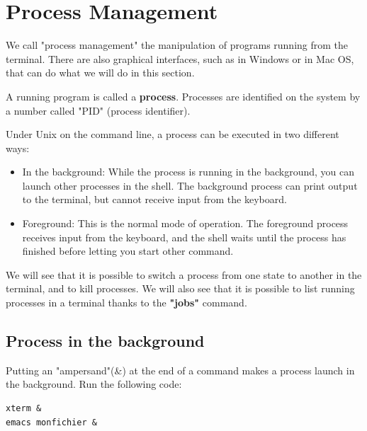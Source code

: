 \documentclass[11pt]{article}
\begin{document}
\section{Process Management}
We call "process management" the manipulation of programs running from the terminal. There are also graphical interfaces, such as in Windows or in Mac OS, that can do what we will do in this section.

A running program is called a \textbf{process}. Processes are identified on the system by a number called "PID" (process identifier).

Under Unix on the command line, a process can be executed in two different ways:


\begin{itemize}
	\item In the background: While the process is running in the background, you can launch other processes in the shell. The background process can print output to the terminal, but cannot receive input from the keyboard.
	\item Foreground: This is the normal mode of operation. The foreground process receives input from the keyboard, and the shell waits until the process has finished before letting you start other command.
\end{itemize}

We will see that it is possible to switch a process from one state to another in the terminal, and to kill processes. We will also see that it is possible to list running processes in a terminal thanks to the \textbf{"jobs"} command.


\subsection{Process in the background}

Putting an "ampersand"(\&) at the end of a command makes a process launch in the background. Run the following code:

\begin{lstlisting}
xterm &
emacs monfichier &
\end{lstlisting}
\end{document}
